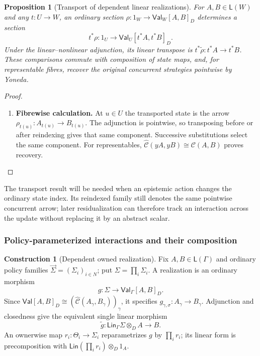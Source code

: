 \documentclass[11pt,a4paper]{article}
\numberwithin{equation}{section}
\newtheorem{proposition}[theorem]{Proposition}
\theoremstyle{definition}
\newtheorem{construction}[construction]{Construction}
\theoremstyle{remark}
\theoremstyle{plain}
\begin{document}
\begin{proposition}[Transport of dependent linear realizations]
\label{prop:egt-dependent-realization-transport}
For $A,B\in\mathsf L(W)$ and any $t:U\to W$, an ordinary section
$\rho:1_W\to\mathsf{Val}_W[A,B]_D$ determines a section
\[
 t^*\rho:1_U\to\mathsf{Val}_U[t^*A,t^*B]_D.
\]
Under the linear--nonlinear adjunction, its linear transpose is
$t^*\widetilde\rho:t^*A\to t^*B$. These comparisons commute with
composition of state maps, and, for representable fibres, recover the
original concurrent strategies pointwise by Yoneda.
\end{proposition}
\begin{proof}
\leavevmode
\begin{enumerate}[label=\textup{(\arabic*)},leftmargin=*,itemsep=4pt,topsep=3pt]
  \item \textbf{Fibrewise calculation.} At $u\in U$ the transported state is the arrow
$\rho_{t(u)}:A_{t(u)}\to B_{t(u)}$. The adjunction is pointwise, so
transposing before or after reindexing gives that same component. Successive substitutions select the same component. For representables,
$\widehat{\mathcal C}(yA,yB)\cong\mathcal C(A,B)$ proves recovery.
\end{enumerate}
\end{proof}

The transport result will be needed when an epistemic action changes
the ordinary state index. Its reindexed family still denotes the same
pointwise concurrent arrow; later residualization can therefore track an
interaction across the update without replacing it by an abstract scalar.

\subsubsection{Policy-parameterized interactions and their composition}

\begin{construction}[Dependent owned realization]
\label{con:egt-dependent-owned-realization}
Fix $A,B\in\mathsf L(\Gamma)$ and ordinary policy families
$\vec\Sigma=(\Sigma_i)_{i\in N}$; put $\Sigma=\prod_i\Sigma_i$.
A realization is an ordinary morphism
\[
 g:\Sigma\longrightarrow\mathsf{Val}_\Gamma[A,B]_D.
\]
Since $\mathsf{Val}[A,B]_D\cong
(\widehat{\mathcal C}(A_\gamma,B_\gamma))_\gamma$, it specifies
$g_{\gamma,\sigma}:A_\gamma\to B_\gamma$. Adjunction and closedness
give the equivalent single linear morphism
\[
 \widetilde g:\mathsf{Lin}_\Gamma\Sigma\otimes_D A\longrightarrow B.
\]
An ownerwise map $r_i:\Theta_i\to\Sigma_i$ reparametrizes $g$ by
$\prod_i r_i$; its linear form is precomposition with
$\mathsf{Lin}(\prod_i r_i)\otimes_D1_A$.
\end{construction}
\end{document}
